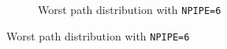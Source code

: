 \begin{figure}[h]
\begin{subfigure}{0.5\textwidth}
	\caption{Worst path distribution with \texttt{NPIPE=6}}
	\label{fig:hist6}
	\end{subfigure}
\end{figure}